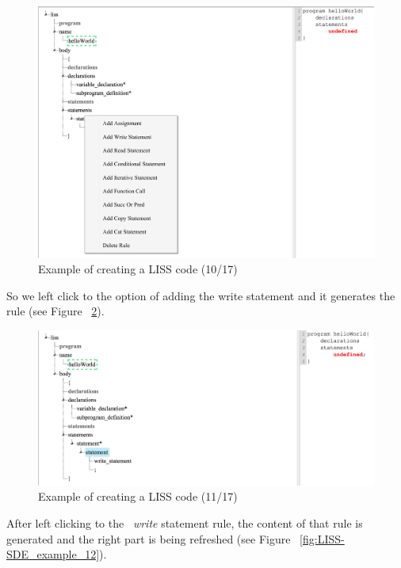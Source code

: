 \documentclass[
  oneside,
  11pt, a4paper,
  footinclude=true,
  headinclude=true,
  cleardoublepage=empty
]{scrbook}
\begin{document}
\begin{figure}[h!]
  \centering
    \includegraphics[width=1\textwidth]{img/LISS-SDE_creating_program/LISS-SDE10.png}
    \caption{Example of creating a LISS code (10/17)}
    \label{fig:LISS-SDE_example_10}
\end{figure}

So we left click to the option of adding the write statement and it generates the rule (see Figure ~\ref{fig:LISS-SDE_example_11}).

\begin{figure}[h!]
  \centering
    \includegraphics[width=1\textwidth]{img/LISS-SDE_creating_program/LISS-SDE11.png}
    \caption{Example of creating a LISS code (11/17)}
    \label{fig:LISS-SDE_example_11}
\end{figure}

After left clicking to the ~\textit{write} statement rule, the content of that rule is generated and the right part is being refreshed (see Figure ~\ref{fig:LISS-SDE_example_12}).
\end{document}
